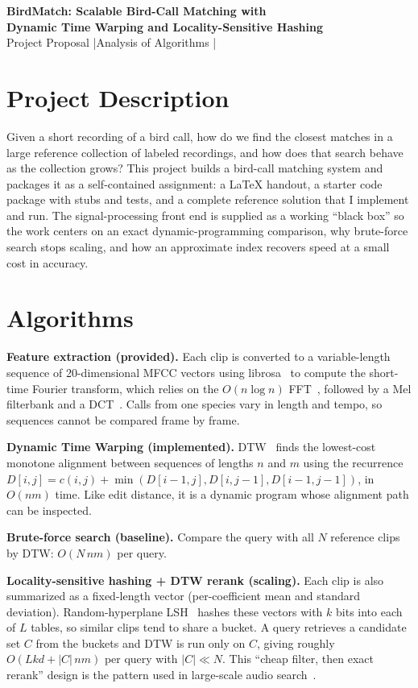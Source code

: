 \documentclass[10pt]{article}
\begin{document}
{\centering
{\Large\bfseries BirdMatch: Scalable Bird-Call Matching with\\[2pt]
Dynamic Time Warping and Locality-Sensitive Hashing}\\[4pt]
Project Proposal \quad|\quad Analysis of Algorithms \quad|\par}

\section{Project Description}
Given a short recording of a bird call, how do we find the closest matches in a large reference collection of labeled recordings, and how does that search behave as the collection grows? This project builds a bird-call matching system and packages it as a self-contained assignment: a LaTeX handout, a starter code package with stubs and tests, and a complete reference solution that I implement and run. The signal-processing front end is supplied as a working ``black box'' so the work centers on an exact dynamic-programming comparison, why brute-force search stops scaling, and how an approximate index recovers speed at a small cost in accuracy.

\section{Algorithms}
\textbf{Feature extraction (provided).} Each clip is converted to a variable-length sequence of 20-dimensional MFCC vectors using librosa~\cite{librosa} to compute the short-time Fourier transform, which relies on the $O(n\log n)$ FFT~\cite{cooley}, followed by a Mel filterbank and a DCT~\cite{davis}. Calls from one species vary in length and tempo, so sequences cannot be compared frame by frame.

\textbf{Dynamic Time Warping (implemented).} DTW~\cite{sakoe} finds the lowest-cost monotone alignment between sequences of lengths $n$ and $m$ using the recurrence $D[i,j]=c(i,j)+\min(D[i{-}1,j],D[i,j{-}1],D[i{-}1,j{-}1])$, in $O(nm)$ time. Like edit distance, it is a dynamic program whose alignment path can be inspected.

\textbf{Brute-force search (baseline).} Compare the query with all $N$ reference clips by DTW: $O(N\,nm)$ per query.

\textbf{Locality-sensitive hashing + DTW rerank (scaling).} Each clip is also summarized as a fixed-length vector (per-coefficient mean and standard deviation). Random-hyperplane LSH~\cite{indyk,charikar} hashes these vectors with $k$ bits into each of $L$ tables, so similar clips tend to share a bucket. A query retrieves a candidate set $C$ from the buckets and DTW is run only on $C$, giving roughly $O(Lkd + |C|\,nm)$ per query with $|C|\ll N$. This ``cheap filter, then exact rerank'' design is the pattern used in large-scale audio search~\cite{wang}.
\end{document}
